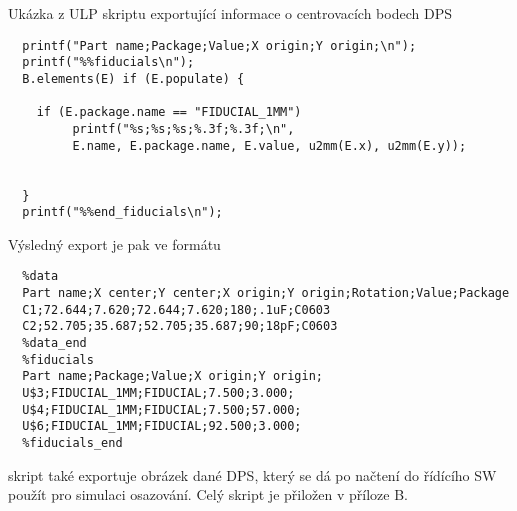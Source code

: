 Ukázka z ULP skriptu exportující informace o centrovacích bodech DPS

\begin{verbatim}
  printf("Part name;Package;Value;X origin;Y origin;\n");
  printf("%%fiducials\n");
  B.elements(E) if (E.populate) {

    if (E.package.name == "FIDUCIAL_1MM") 
         printf("%s;%s;%s;%.3f;%.3f;\n",
         E.name, E.package.name, E.value, u2mm(E.x), u2mm(E.y));  


  }
  printf("%%end_fiducials\n");
\end{verbatim}

Výsledný export je pak ve formátu 
\begin{verbatim}
  %data
  Part name;X center;Y center;X origin;Y origin;Rotation;Value;Package
  C1;72.644;7.620;72.644;7.620;180;.1uF;C0603
  C2;52.705;35.687;52.705;35.687;90;18pF;C0603
  %data_end
  %fiducials
  Part name;Package;Value;X origin;Y origin;
  U$3;FIDUCIAL_1MM;FIDUCIAL;7.500;3.000;
  U$4;FIDUCIAL_1MM;FIDUCIAL;7.500;57.000;
  U$6;FIDUCIAL_1MM;FIDUCIAL;92.500;3.000;
  %fiducials_end
\end{verbatim}

skript také exportuje obrázek dané DPS, který se dá po načtení do řídícího SW použít pro simulaci osazování. Celý skript je přiložen v příloze B.

